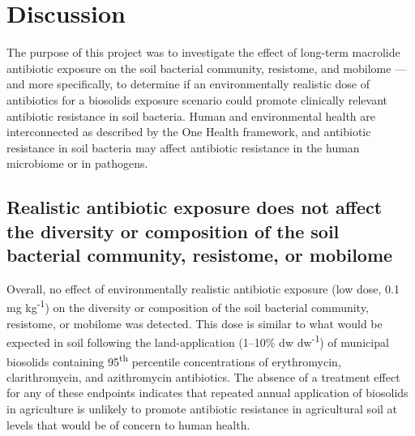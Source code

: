 \chapter{Discussion}

The purpose of this project was to investigate the effect of long-term macrolide antibiotic exposure on the soil bacterial community, resistome, and mobilome --- and more specifically, to determine if an environmentally realistic dose of antibiotics for a biosolids exposure scenario could promote clinically relevant antibiotic resistance in soil bacteria.
Human and environmental health are interconnected as described by the One Health framework, and antibiotic resistance in soil bacteria may affect antibiotic resistance in the human microbiome or in pathogens.

\section{Realistic antibiotic exposure does not affect the diversity or composition of the soil bacterial community, resistome, or mobilome}

Overall, no effect of environmentally realistic antibiotic exposure (low dose, 0.1 mg kg\textsuperscript{-1}) on the diversity or composition of the soil bacterial community, resistome, or mobilome was detected.
This dose is similar to what would be expected in soil following the land-application (1--10\% dw dw\textsuperscript{-1}) of municipal biosolids containing 95\textsuperscript{th} percentile concentrations of erythromycin, clarithromycin, and azithromycin antibiotics.
The absence of a treatment effect for any of these endpoints indicates that repeated annual application of biosolids in agriculture is unlikely to promote antibiotic resistance in agricultural soil at levels that would be of concern to human health.

